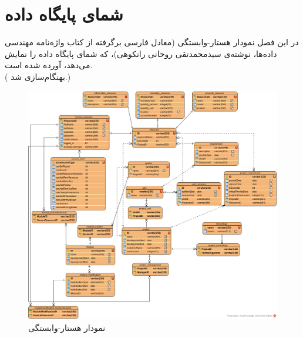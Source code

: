\chapter{شمای پایگاه داده}
در این فصل نمودار هستار-وابستگی (معادل فارسی برگرفته از کتاب واژه‌نامه مهندسی داده‌ها، نوشته‌ی سیدمحمدتقی روحانی رانکوهی)، که شمای پایگاه داده را نمایش می‌دهد، آورده شده است.\\
({\color{red} بهنگام‌سازی شد.})

\newpage
\begin{landscape}
\begin{figure}[H]
	\centering
	\includegraphics[scale=0.45]{img/erd/ERD}
	\caption{نمودار هستار-وابستگی}
\end{figure}
\end{landscape}
